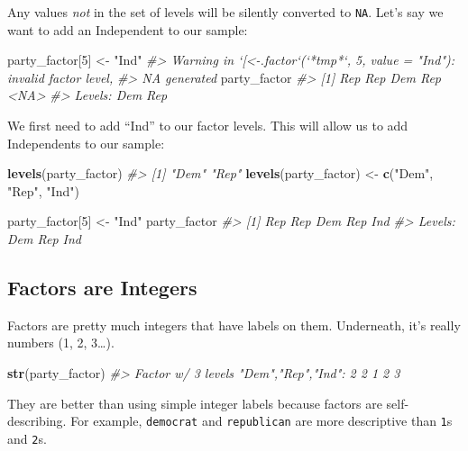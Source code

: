 \documentclass[]{book}
\newenvironment{Shaded}{\begin{snugshade}}{\end{snugshade}}
\newcommand{\KeywordTok}[1]{\textcolor[rgb]{0.13,0.29,0.53}{\textbf{#1}}}
\newcommand{\DecValTok}[1]{\textcolor[rgb]{0.00,0.00,0.81}{#1}}
\newcommand{\StringTok}[1]{\textcolor[rgb]{0.31,0.60,0.02}{#1}}
\newcommand{\CommentTok}[1]{\textcolor[rgb]{0.56,0.35,0.01}{\textit{#1}}}
\newcommand{\NormalTok}[1]{#1}
\begin{document}
Any values \emph{not} in the set of levels will be silently converted to
\texttt{NA}. Let's say we want to add an Independent to our sample:

\begin{Shaded}
\begin{Highlighting}[]
\NormalTok{party_factor[}\DecValTok{5}\NormalTok{] <-}\StringTok{ "Ind"}
\CommentTok{#> Warning in `[<-.factor`(`*tmp*`, 5, value = "Ind"): invalid factor level,}
\CommentTok{#> NA generated}
\NormalTok{party_factor}
\CommentTok{#> [1] Rep  Rep  Dem  Rep  <NA>}
\CommentTok{#> Levels: Dem Rep}
\end{Highlighting}
\end{Shaded}

We first need to add ``Ind'' to our factor levels. This will allow us to
add Independents to our sample:

\begin{Shaded}
\begin{Highlighting}[]
\KeywordTok{levels}\NormalTok{(party_factor)}
\CommentTok{#> [1] "Dem" "Rep"}
\KeywordTok{levels}\NormalTok{(party_factor) <-}\StringTok{ }\KeywordTok{c}\NormalTok{(}\StringTok{"Dem"}\NormalTok{, }\StringTok{"Rep"}\NormalTok{, }\StringTok{"Ind"}\NormalTok{)}

\NormalTok{party_factor[}\DecValTok{5}\NormalTok{] <-}\StringTok{ "Ind"}
\NormalTok{party_factor}
\CommentTok{#> [1] Rep Rep Dem Rep Ind}
\CommentTok{#> Levels: Dem Rep Ind}
\end{Highlighting}
\end{Shaded}

\subsection{Factors are Integers}\label{factors-are-integers}

Factors are pretty much integers that have labels on them. Underneath,
it's really numbers (1, 2, 3\ldots{}).

\begin{Shaded}
\begin{Highlighting}[]
\KeywordTok{str}\NormalTok{(party_factor)}
\CommentTok{#>  Factor w/ 3 levels "Dem","Rep","Ind": 2 2 1 2 3}
\end{Highlighting}
\end{Shaded}

They are better than using simple integer labels because factors are
self-describing. For example, \texttt{democrat} and \texttt{republican}
are more descriptive than \texttt{1}s and \texttt{2}s.
\end{document}
